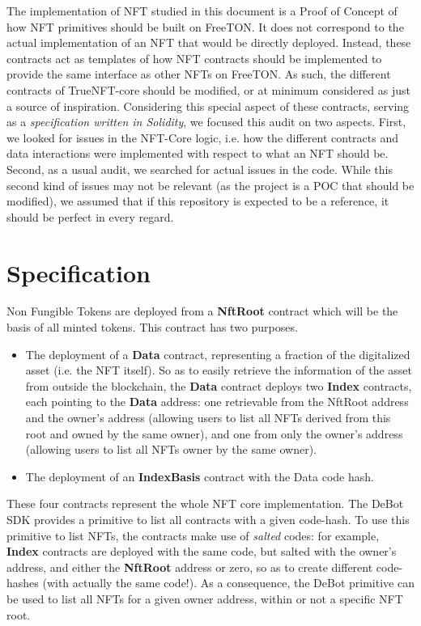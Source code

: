 
The implementation of NFT studied in this document is a Proof of Concept
of how NFT primitives should be built on FreeTON.
%
It does not correspond to the actual implementation of an NFT that would
be directly deployed.
%
Instead, these contracts act as templates of how NFT contracts should be implemented to provide the same interface as other NFTs on FreeTON.
%
As such, the different contracts of TrueNFT-core should be modified, or at minimum considered as just a source of inspiration.
%
Considering this special aspect of these contracts, serving as a 
\emph{specification written in Solidity}, we focused this audit on two 
aspects.
%
First, we looked for issues in the NFT-Core logic, i.e. how the different
contracts and data interactions were implemented with respect to what an NFT
should be.
%
Second, as a usual audit, we searched for actual issues in the code.
%
While this second kind of issues may not be relevant (as the project is a 
POC that should be modified), we assumed that if this repository is expected
to be a reference, it should be perfect in every regard. 

\section{Specification}

Non Fungible Tokens are deployed from a \textbf{NftRoot} contract which will
be the basis of all minted tokens.
%
This contract has two purposes.
\begin{itemize}
    \item The deployment of a \textbf{Data} contract, representing a
    fraction of the digitalized asset (i.e. the NFT itself). So as to
    easily retrieve the information of the asset from outside the
    blockchain, the \textbf{Data} contract deploys two \textbf{Index}
    contracts, each pointing to the \textbf{Data} address: one
    retrievable from the NftRoot address and the owner's address
    (allowing users to list all NFTs derived from this root and owned
    by the same owner), and one from only the owner's address
    (allowing users to list all NFTs owner by the same owner).

\item The deployment of an \textbf{IndexBasis} contract with the Data code hash.
\end{itemize}

These four contracts represent the whole NFT core implementation.
%
The DeBot SDK provides a primitive to list all contracts with a given
code-hash. To use this primitive to list NFTs, the contracts make use
of {\em salted} codes: for example, \textbf{Index} contracts are
deployed with the same code, but salted with the owner's address, and
either the \textbf{NftRoot} address or zero, so as to create different
code-hashes (with actually the same code!). As a consequence, the
DeBot primitive can be used to list all NFTs for a given owner
address, within or not a specific NFT root.

